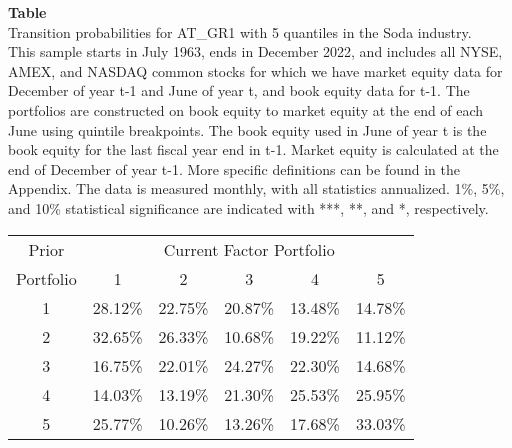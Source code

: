 \begin{table*}[ht!]
\raggedright
{}
\label{tab: transition_probs_AT_GR1_Soda_with_5_quantiles}
\textbf{Table \thetable} \\
Transition probabilities for AT_GR1 with 5 quantiles in the Soda industry. \\
\hspace*{1em}This sample starts in July 1963, ends in December 2022, and includes all NYSE, AMEX, and NASDAQ common stocks for which we have market equity data for December of year t-1 and June of year t, and book equity data for t-1. The portfolios are constructed on book equity to market equity at the end of each June using quintile breakpoints.  The book equity used in June of year t is the book equity for the last fiscal year end in t-1.  Market equity is calculated at the end of December of year t-1.  More specific definitions can be found in the Appendix.  The data is measured monthly, with all statistics annualized.  1\%, 5\%, and 10\% statistical significance are indicated with ***, **, and *, respectively. \\
\vspace{0.5em}
\centering
\begin{adjustbox}{max width=\textwidth}
\begin{tabular}{@{}cccccc@{}}
\toprule
Prior & \multicolumn{5}{c}{Current Factor Portfolio} \\
Portfolio & 1 & 2 & 3 & 4 & 5 \\
\midrule
1 & 28.12\% & 22.75\% & 20.87\% & 13.48\% & 14.78\% \\
2 & 32.65\% & 26.33\% & 10.68\% & 19.22\% & 11.12\% \\
3 & 16.75\% & 22.01\% & 24.27\% & 22.30\% & 14.68\% \\
4 & 14.03\% & 13.19\% & 21.30\% & 25.53\% & 25.95\% \\
5 & 25.77\% & 10.26\% & 13.26\% & 17.68\% & 33.03\% \\
\bottomrule
\end{tabular}
\end{adjustbox}
\end{table*}